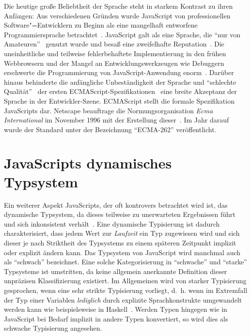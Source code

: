 Die heutige große Beliebtheit der Sprache steht in starkem Kontrast zu ihren Anfängen: Aus verschiedenen Gründen wurde JavaScript von professionellen Software"=Entwicklern zu Beginn als eine mangelhaft entworfene Programmiersprache betrachtet~\autocite{CROCKFORD:JS_POPULAR}. JavaScript galt als eine Sprache, die \enquote{nur von Amateuren}~\autocite{CROCKFORD:JS_MISUNDERSTOOD} genutzt wurde und besaß eine zweifelhafte Reputation~\autocite{THIEMANN:2005,THOMAS:2007}. Die uneinheitliche und teilweise fehlerbehaftete Implementierung in den frühen Webbrowsern und der Mangel an Entwicklungswerkzeugen wie Debuggern erschwerte die Programmierung von JavaScript-Anwendung enorm~\autocite{OREILLY:JS_HOW_DID_WE_GET_THERE}. Darüber hinaus behinderte die anfängliche Unbeständigkeit der Sprache und \enquote{schlechte Qualität}~\autocite{CROCKFORD:JS_MISUNDERSTOOD} der ersten ECMAScript-Spezifikationen~\autocite{ECMASCRIPT:1997} eine breite Akzeptanz der Sprache in der Entwickler-Szene. ECMAScript stellt die formale Spezifikation JavaScripts dar. Netscape beauftrage die Normungsorganisation \textit{Ecma International} im November 1996 mit der Erstellung dieser~\autocite{ECMASCRIPT:1997}. Im Jahr darauf wurde der Standard unter der Bezeichnung \enquote{ECMA-262} veröffentlicht.

\section{JavaScripts dynamisches Typsystem}

Ein weiterer Aspekt JavaScripts, der oft kontrovers betrachtet wird ist, das dynamische Typsystem, da dieses teilweise zu unerwarteten Ergebnissen führt und sich inkonsistent verhält~\autocite{PRADEL:2015,RICHARDS:2010}. Eine dynamische Typisierung ist dadurch charakterisiert, dass jedem Wert zur \emph{Laufzeit} ein Typ zugewiesen wird und sich dieser je nach Striktheit des Typsystems zu einem späteren Zeitpunkt implizit oder explizit ändern kann.
Das Typsystem von JavaScript wird manchmal auch als \enquote{schwach} bezeichnet. Eine solche Kategorisierung in \enquote{schwache} und \enquote{starke} Typsysteme ist umstritten, da keine allgemein anerkannte Definition dieser unpräzisen Klassifizierung existiert. Im Allgemeinen wird von starker Typisierung gesprochen, wenn eine sehr strikte Typisierung vorliegt, d.~h. wenn im Extremfall der Typ einer Variablen \emph{lediglich} durch explizite Sprachkonstrukte umgewandelt werden kann wie beispielsweise in Haskell~\autocite{HASKELL}. Werden Typen hingegen wie in JavaScript bei Bedarf implizit in andere Typen konvertiert, so wird dies als schwache Typisierung angesehen.

